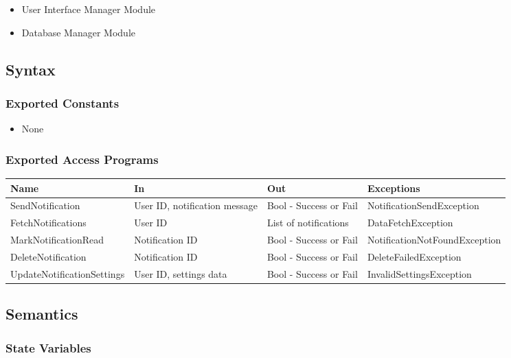 \documentclass[12pt, titlepage]{article}
\begin{document}
\begin{itemize}
    \item User Interface Manager Module
    \item Database Manager Module
\end{itemize}

\subsection{Syntax}

\subsubsection{Exported Constants}

\begin{itemize}
    \item None
\end{itemize}

\subsubsection{Exported Access Programs}

\begin{center}
\begin{tabular}{p{5cm} p{3cm} p{3cm} p{5cm}}
\hline
\textbf{Name} & \textbf{In} & \textbf{Out} & \textbf{Exceptions} \\
\hline
SendNotification & User ID, notification message & Bool - Success or Fail & NotificationSendException \\
\hline
FetchNotifications & User ID & List of notifications & DataFetchException \\
\hline
MarkNotificationRead & Notification ID & Bool - Success or Fail & NotificationNotFoundException \\
\hline
DeleteNotification & Notification ID & Bool - Success or Fail & DeleteFailedException \\
\hline
UpdateNotificationSettings & User ID, settings data & Bool - Success or Fail & InvalidSettingsException \\
\hline
\end{tabular}
\end{center}

\subsection{Semantics}

\subsubsection{State Variables}
\end{document}
